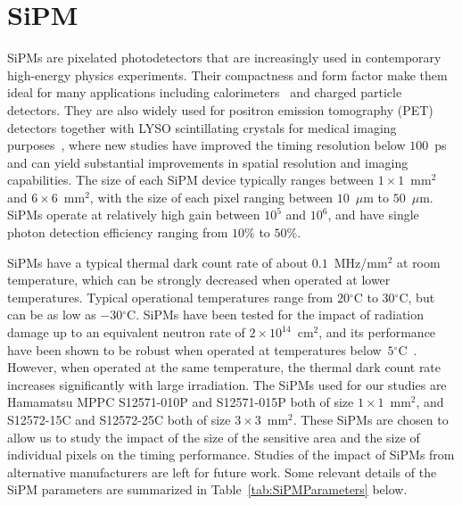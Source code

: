 \section{SiPM}
\label{sec:sipm}

SiPMs are pixelated photodetectors that are increasingly
used in contemporary high-energy physics experiments. Their compactness and form
factor make them ideal for many applications including calorimeters~\cite{Andreev:2004uy}
and charged particle detectors. They are also widely used for positron emission tomography
(PET) detectors together with LYSO scintillating crystals for medical imaging
purposes~\cite{Vandenberghe2016}, where new studies have improved the 
timing resolution below $100$~ps~\cite{LecoqTOFPET} and 
 can yield substantial improvements in spatial resolution and imaging 
 capabilities. The size of each SiPM device typically
ranges between $1\times 1$~$\mathrm{mm}^{2}$ and $6\times 6$~$\mathrm{mm}^{2}$,
with the size of each pixel ranging between $10$~$\mu$m to $50$~$\mu$m. SiPMs operate
at relatively high gain between $10^{5}$ and $10^{6}$, and have single photon detection
efficiency ranging from $10\%$ to $50\%$. 


SiPMs have a typical thermal dark count rate of about
$0.1$~MHz/$\mathrm{mm}^{2}$ at room temperature, which can be strongly decreased
when operated at lower temperatures. Typical operational temperatures range from
$20$$^{\circ}$C to $30$$^{\circ}$C, but can be as low as $-30$$^{\circ}$C. SiPMs have
been tested for the impact of radiation damage up to an equivalent neutron rate
of $2\times10^{14}$~$\mathrm{cm}^{2}$, and its performance have been shown to be
robust when operated at temperatures 
below~$5$$^{\circ}$C~\cite{SiPMIrradiated1,SiPMIrradiated2}. However, when operated
at the same temperature, the thermal dark count rate increases significantly
with large irradiation. The SiPMs used for our studies are Hamamatsu MPPC
S12571-010P and S12571-015P both of size $1\times1$~$\mathrm{mm}^{2}$, and
S12572-15C and S12572-25C both of size $3\times3$~$\mathrm{mm}^{2}$. These SiPMs
are chosen to allow us to study the impact of the size of the sensitive area and
the size of individual pixels on the timing performance. Studies of the impact
of SiPMs from alternative manufacturers are left for future work. Some relevant
details of the SiPM parameters are summarized in Table~\ref{tab:SiPMParameters}
below.

